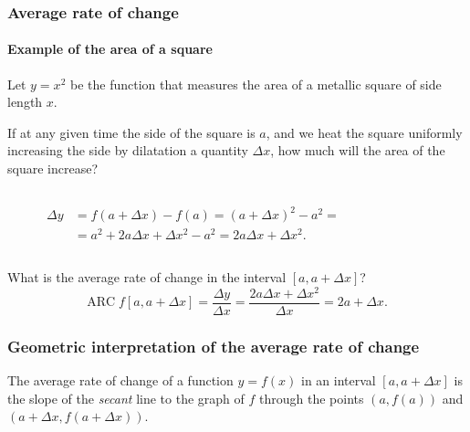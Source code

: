 \begin{frame}
	\frametitle{Average rate of change}
	\framesubtitle{Example of the area of a square}
	Let $y=x^2$ be the function that measures the area of a metallic square of side length $x$.
	
	If at any given time the side of the square is $a$, and we heat the square uniformly increasing the side by dilatation a quantity $\Delta x$, how much will the area of the square increase?
	\begin{columns}
		\begin{column}{0.3\textwidth}
			\begin{align*}
				\Delta y & = f(a+\Delta x)-f(a)=(a+\Delta x)^2-a^2=\\
				         & = a^2+2a\Delta x+\Delta x^2-a^2=2a\Delta x+\Delta x^2. 
			\end{align*}
		\end{column}
		\begin{column}{0.3\textwidth}
			\begin{center}
			\end{center}
		\end{column}
	\end{columns}
	What is the average rate of change in the interval $[a,a+\Delta x]$?
	\[
		\mbox{ARC}\;f[a,a+\Delta x]=\frac{\Delta y}{\Delta x}=\frac{2a\Delta x+\Delta x^2}{\Delta x}=2a+\Delta x.
	\]
\end{frame}


\begin{frame}
	\frametitle{Geometric interpretation of the average rate of change}
	The average rate of change of a function $y=f(x)$ in an interval $[a,a+\Delta x]$ is the slope of the \emph{secant} line to the graph of $f$ through the points $(a,f(a))$ and $(a+\Delta x,f(a+\Delta x))$.
	\begin{center}
		
	\end{center}
\end{frame} 


